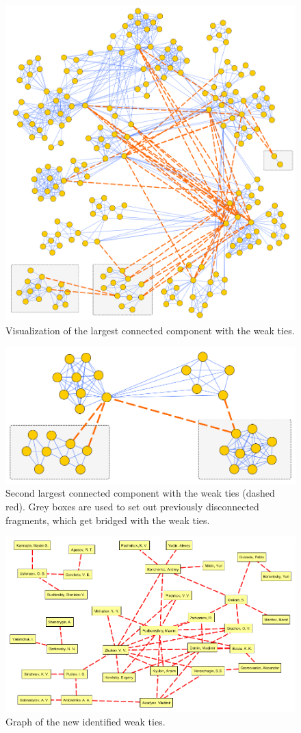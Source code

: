 \documentclass[12pt]{report}
\theoremstyle{definition}
\begin{document}
\begin{figure}[ht]
	\centering
	\includegraphics[width=1.0\textwidth]{wt2eng}
	\caption{Visualization of the largest connected component with the weak ties.}
	\label{fig:wt2} 
\end{figure}

\begin{figure}[ht]
	\centering
	\includegraphics[width=1.0\textwidth]{wt3eng}
	\caption{Second largest connected component with the weak ties (dashed red). Grey boxes are used to set out previously disconnected fragments, which get bridged with the weak ties.}
	\label{fig:wt3}
\end{figure}


\begin{figure}[ht]
	\centering
	\includegraphics[width=1.0\textwidth]{wt4eng}
	\caption{Graph of the new identified weak ties.}
	\label{fig:wt4}
\end{figure}
\end{document}
